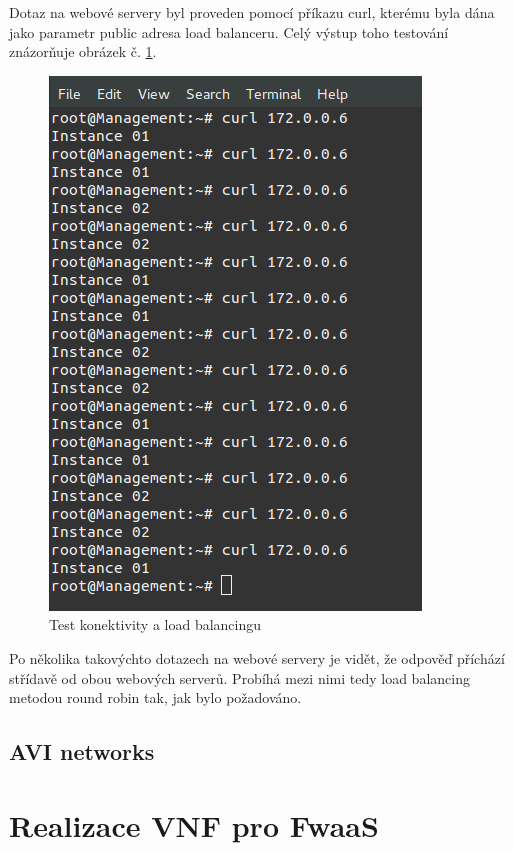 Dotaz na webové servery byl proveden pomocí příkazu curl, kterému byla dána jako parametr public adresa load balanceru. Celý výstup toho testování znázorňuje obrázek č. \ref{fig:lbaas_testing}. 

\begin{figure}[h]
\begin{centering}
\includegraphics[scale=0.3]{images/lbaas_testing}
\par\end{centering}
\caption{Test konektivity a load balancingu\label{fig:lbaas_testing}}
\end{figure}

Po několika takovýchto dotazech na webové servery je vidět, že odpověď příchází střídavě od obou webových serverů. Probíhá mezi nimi tedy load balancing metodou round robin tak, jak bylo požadováno.

\subsection{AVI networks}

\section{Realizace VNF pro FwaaS}

